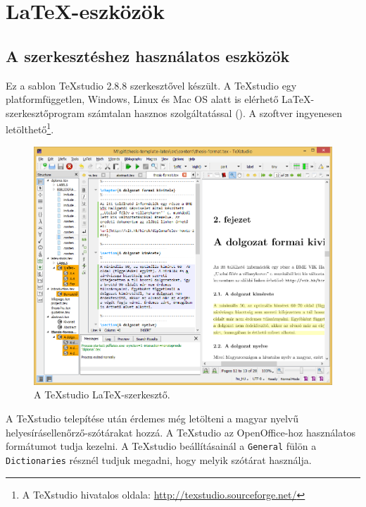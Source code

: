 \chapter{\LaTeX-eszközök}
\label{sec:LatexTools}
\section{A szerkesztéshez használatos eszközök}
Ez a sablon TeXstudio 2.8.8 szerkesztővel készült. A TeXstudio egy platformfüggetlen, Windows, Linux és Mac OS alatt is elérhető \LaTeX-szerkesztőprogram számtalan hasznos szolgáltatással (). A szoftver ingyenesen letölthető\footnote{A TeXstudio hivatalos oldala: \url{http://texstudio.sourceforge.net/}}.

\begin{figure}[!ht]
\centering
\includegraphics[width=150mm, keepaspectratio]{figures/TeXstudio.png}
\caption{A TeXstudio \LaTeX-szerkesztő.}
\label{fig:TeXstudio}
\end{figure}

A TeXstudio telepítése után érdemes még letölteni a magyar nyelvű helyesírásellenőrző-szótárakat hozzá. A TeXstudio az OpenOffice-hoz használatos formátumot tudja kezelni. A TeXstudio beállításainál a \verb+General+ fülön a \verb+Dictionaries+ résznél tudjuk megadni, hogy melyik szótárat használja.

